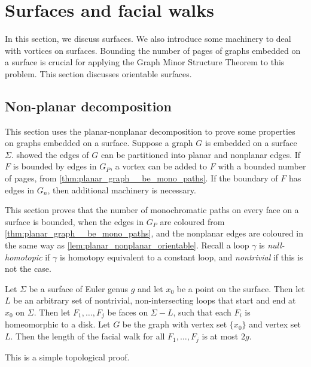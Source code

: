 
\section{Surfaces and facial walks}
In this section, we discuss surfaces. We also introduce some machinery to deal with vortices on surfaces. Bounding the number of pages of graphs embedded on a surface is crucial for applying the Graph Minor Structure Theorem to this problem. This section discusses orientable surfaces.
\subsection{Non-planar decomposition}

This section uses the planar-nonplanar decomposition to prove some properties on graphs embedded on a surface. Suppose a graph \(G\) is embedded on a surface $\Sigma$. \textcite{heathPagenumberGenusGraphs1992} showed the edges of $G$ can be partitioned into planar and nonplanar edges. If \(F\) is bounded by edges in $G_P$, a vortex can be added to \(F\) with a bounded number of pages, from \cref{thm:planar_graph__be_mono_paths}. If the boundary of $F$ has edges in $G_n$, then additional machinery is necessary.

This section proves that the number of monochromatic paths on every face on a surface is bounded, when the edges in $G_P$ are coloured from \cref{thm:planar_graph__be_mono_paths}, and the nonplanar edges are coloured in the same way as \cref{lem:planar_nonplanar_orientable}. Recall a loop $\gamma$ is \textit{null-homotopic} if $\gamma$ is homotopy equivalent to a constant loop, and \textit{nontrivial} if this is not the case. 
\begin{lemma}\label{lem:orientable_facial_walks}
	Let \(\Sigma \) be a surface of Euler genus \(g\) and let \(x_0\) be a point on the surface. Then let \(L\) be an arbitrary set of nontrivial, non-intersecting loops that start and end at \(x_0\) on \(\Sigma \). Then let \(F_1, \ldots, F_j\) be faces on \(\Sigma - L\), such that each \(F_i\) is homeomorphic to a disk. Let $G$ be the graph with vertex set $\{x_0 \}$ and vertex set $L$. Then the length of the facial walk for all $F_1, \ldots, F_j$ is at most \(2g\).
\end{lemma}

This is a simple topological proof.

